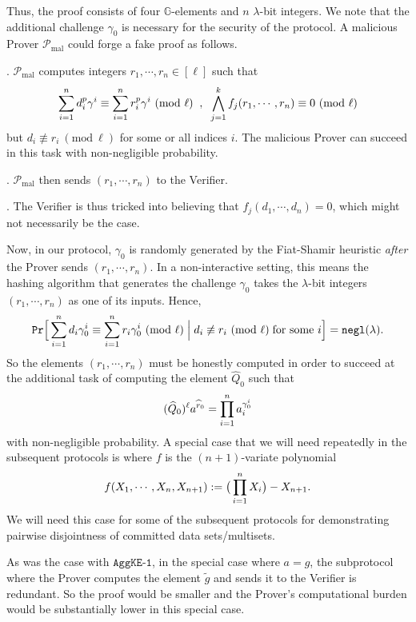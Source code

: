 \documentclass[11pt, lettersize, notitlepage, leqno, footskip=0.6cm]{article}
\newcommand{\pl}{\prod\limits}
\newcommand{\slim}{\sum\limits}
\newcommand{\ttt}{\texttt}
\newcommand{\negl}{\ttt{{negl}}}
\newcommand{\wti}{\widetilde}
\newcommand{\mc}{\mathcal}
\newcommand{\mb}{\mathbb}
\newcommand{\mr}{\mathrm}
\newcommand{\lam}{\lambda}
\newcommand{\what}{\widehat}
\newcommand{\mP}{\mc{P}}
\newcommand{\vs}{\vspace{-0.15cm}}
\newcommand{\noin}{\noindent}
\newcommand{\Mod}[1]{\ (\mathrm{mod}\ #1)}
\numberwithin{equation}{section}
\begin{document}
\vspace{0.1cm}

Thus, the proof consists of four $\mb{G}$-elements and $n$ $\lam$-bit integers. We note that the additional challenge $\gamma_{0}$ is necessary for the security of the protocol. A malicious Prover $\mP_{\mr{mal}}$ could forge a fake proof as follows.

\noin 1. $\mP_{\mr{mal}}$ computes integers $r_1,\cdots,r_n\in[\ell]$ such that \vs $$ \slim_{i=1}^n d_i^{p}\gamma^i\equiv\slim_{i=1}^n r_i^{p}\gamma^i\Mod{\ell} \;\;,\;\; \bigwedge\limits_{j=1}^k f_j(r_1,\cdots,r_n) \equiv 0\Mod{\ell} \vs $$ but $d_i\not\equiv r_i\Mod{\ell}$ for some or all indices $i$. The malicious Prover can succeed in this task with non-negligible probability.

\noin 2. $\mP_{\mr{mal}}$ then sends $(r_1,\cdots,r_n)$ to the Verifier.

\noin 3. The Verifier is thus tricked into believing that $f_j(d_1,\cdots,d_n) = 0$, which might not necessarily be the case.

Now, in our protocol, $\gamma_{0}$ is randomly generated by the Fiat-Shamir heuristic \textit{after} the Prover sends $(r_1,\cdots,r_n)$. In a non-interactive setting, this means the hashing algorithm that generates the challenge $\gamma_{0}$ takes the $\lam$-bit integers $(r_1,\cdots,r_n)$ as one of its inputs. Hence, \vs $$\ttt{Pr}\Big[\slim_{i=1}^n d_i\gamma_{0}^i \equiv \slim_{i=1}^n r_i\gamma_{0}^i \Mod{\ell}\;\Big|\; d_i\not\equiv r_i\Mod{\ell}\;\text{for some } i\Big] = \negl(\lam). \vs $$ So the elements $(r_1,\cdots,r_n)$ must be honestly computed in order to succeed at the additional task of computing the element $\what{Q}_0$ such that \vspace{-0.2cm} $$(\what{Q}_0)^{\ell}a^{\what{r}_0} = \pl_{i=1}^{n} a_i^{\gamma_{0}^i} \vs $$ with non-negligible probability. A special case that we will need repeatedly in the subsequent protocols is where $f$ is the $(n+1)$-variate polynomial \vspace{-0.2cm} $$f(X_1,\cdots,X_n, X_{n+1}) := \big(\pl_{i=1}^n X_i \big)- X_{n+1}.\vs $$ We will need this case for some of the subsequent protocols for demonstrating pairwise disjointness of committed data sets/multisets.

As was the case with $\ttt{AggKE-1}$, in the special case where $a = g$, the subprotocol where the Prover computes the element $\wti{g}$ and sends it to the Verifier is redundant. So the proof would be smaller and the Prover's computational burden would be substantially lower in this special case.
\end{document}
